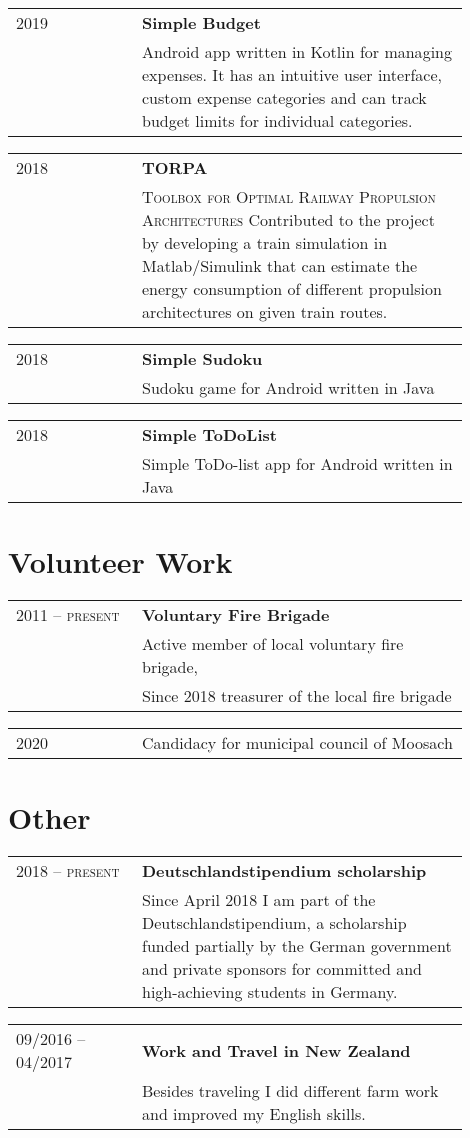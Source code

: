 \documentclass[a4paper, ]{article}
\newenvironment{cventry}[2]
{   
    \setlength{\tabcolsep}{1.25em}
    \hypersetup{urlcolor=black}
    \begin{center}\hspace{-1.25cm}\begin{tabular}{p{0.25\linewidth}|p{0.65\linewidth}}
    \raggedleft\scshape #1 & \bfseries#2 \vspace{0.1cm}\\ & 
}
{\end{tabular}\end{center}}
\newenvironment{cventrynoheading}[1]
{
    \setlength{\tabcolsep}{1.25em}
    \begin{center}\hspace{-1.25cm}\begin{tabular}{p{0.25\linewidth}|p{0.65\linewidth}}
    \raggedleft\scshape #1 & 
}
{\end{tabular}\end{center}}
\newcommand{\newentryline}{\\&}
\begin{document}
\begin{cventry}{2019}
    {Simple Budget \href{https://github.com/korbi98/Simple-Budget}{\normalfont\faGithub}}
    Android app written in Kotlin for managing expenses. It has an intuitive 
    user interface, custom expense categories and can track budget limits 
    for individual categories.
\end{cventry}

\begin{cventry}{2018}
    {TORPA \href{https://www.researchgate.net/project/TORPA-Toolbox-for-Optimal-Railway-Propulsion-Architectures}{\normalfont\faLink}}
    {\scshape Toolbox for Optimal Railway Propulsion Architectures}
    Contributed to the project by developing a train simulation 
    in Matlab/Simulink that can estimate the energy consumption of 
    different propulsion architectures on given train routes.
\end{cventry}

\begin{cventry}{2018}
    {Simple Sudoku \href{https://github.com/korbi98/Simple-Sudoku}{\normalfont\faGithub}}
    Sudoku game for Android written in Java
\end{cventry}

\begin{cventry}{2018}
    {Simple ToDoList \href{https://github.com/korbi98/Simple-ToDoList}{\normalfont\faGithub}}
    Simple ToDo-list app for Android written in Java
\end{cventry}


\section{Volunteer Work}

\begin{cventry}{2011 -- present}{Voluntary Fire Brigade}
    Active member of local voluntary fire brigade, \newentryline 
    Since 2018 treasurer of the local fire brigade
\end{cventry}

\begin{cventrynoheading}{2020}
    Candidacy for municipal council of Moosach
\end{cventrynoheading}


\section{Other}

\begin{cventry}{2018 -- present} {Deutschlandstipendium scholarship}
    Since April 2018 I am part of the Deutschlandstipendium, a scholarship 
    funded partially by the German government and private sponsors for 
    committed and high-achieving students in Germany.
\end{cventry}

\begin{cventry}{09/2016 -- 04/2017}{Work and Travel in New Zealand}
    Besides traveling I did different farm work and improved my English skills.
\end{cventry}
\end{document}
